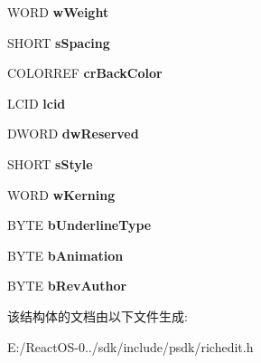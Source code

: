 \begin{DoxyCompactItemize}
\item 
\mbox{\label{struct__charformat2a_af558c95b1c4496868be3ec9a193eabaf}} 
W\+O\+RD {\bfseries w\+Weight}
\item 
\mbox{\label{struct__charformat2a_a753d1ac5f86ec7b4d2c63fdba39d8e2a}} 
S\+H\+O\+RT {\bfseries s\+Spacing}
\item 
\mbox{\label{struct__charformat2a_a20b1afab70b27201ab42826ac3ce675e}} 
C\+O\+L\+O\+R\+R\+EF {\bfseries cr\+Back\+Color}
\item 
\mbox{\label{struct__charformat2a_a913ab8381a4092563a4c9ff94bc14d1d}} 
L\+C\+ID {\bfseries lcid}
\item 
\mbox{\label{struct__charformat2a_ad8f1a6885a1d1eb6a2ec57191d9efba2}} 
D\+W\+O\+RD {\bfseries dw\+Reserved}
\item 
\mbox{\label{struct__charformat2a_a83f0a9c04d65f68b404a283f25917be5}} 
S\+H\+O\+RT {\bfseries s\+Style}
\item 
\mbox{\label{struct__charformat2a_aa5d1b881392b96d8ed2ee52e85a2d727}} 
W\+O\+RD {\bfseries w\+Kerning}
\item 
\mbox{\label{struct__charformat2a_a5290d27672ec8eeea862ece59e9da630}} 
B\+Y\+TE {\bfseries b\+Underline\+Type}
\item 
\mbox{\label{struct__charformat2a_ae69e03046ce8327cf75a198d54913b1f}} 
B\+Y\+TE {\bfseries b\+Animation}
\item 
\mbox{\label{struct__charformat2a_a26d6ca421153c0846f8530134d59b90e}} 
B\+Y\+TE {\bfseries b\+Rev\+Author}
\end{DoxyCompactItemize}


该结构体的文档由以下文件生成\+:\begin{DoxyCompactItemize}
\item 
E\+:/\+React\+O\+S-\/0../sdk/include/psdk/richedit.\+h\end{DoxyCompactItemize}
